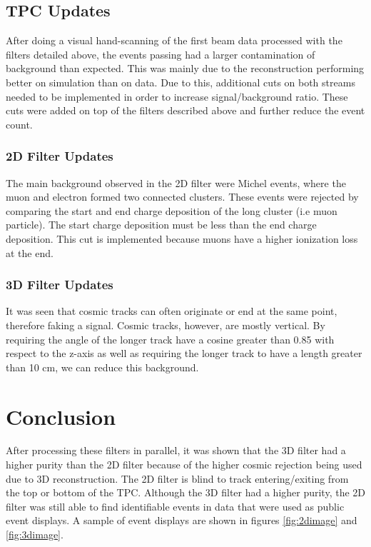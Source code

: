 \subsection{TPC Updates}
After doing a visual hand-scanning of the first beam data processed with the filters detailed above, the events passing had a larger contamination of background than expected. This was mainly due to the reconstruction performing better on simulation than on data. Due to this, additional cuts on both streams needed to be implemented in order to increase signal/background ratio. These cuts were added on top of the filters described above and further reduce the event count. 
\subsubsection{2D Filter Updates}
The main background observed in the 2D filter were Michel events, where the muon and electron formed two connected clusters. These events were rejected by comparing the start and end charge deposition of the long cluster (i.e muon particle). The start charge deposition must be less than the end charge deposition. This cut is implemented because muons have a higher ionization loss at the end. 
\subsubsection{3D Filter Updates}
It was seen that cosmic tracks can often originate or end at the same point, therefore faking a signal. Cosmic tracks, however, are mostly vertical. By requiring the angle of the longer track have a cosine greater than 0.85 with respect to the z-axis as well as requiring the longer track to have a length greater than 10 cm, we can reduce this background. 
\section{Conclusion}
After processing these filters in parallel, it was shown that the 3D filter had a higher purity than the 2D filter because of the higher cosmic rejection being used due to 3D reconstruction. The 2D filter is blind to track entering/exiting from the top or bottom of the TPC. Although the 3D filter had a higher purity, the 2D filter was still able to find identifiable events in data that were used as public event displays. A sample of event displays are shown in figures \ref{fig:2dimage} and \ref{fig:3dimage}.

